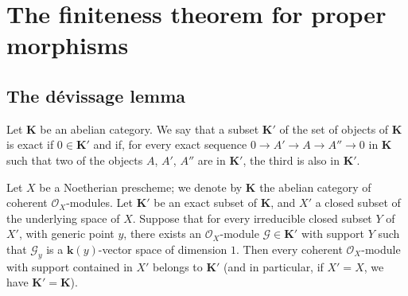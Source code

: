 \section{The finiteness theorem for proper morphisms}
\label{section:III.3}

\subsection{The dévissage lemma}
\label{subsection:III.3.1}

\begin{definition}[3.1.1]
\label{III.3.1.1}
Let $\boldsymbol{K}$ be an abelian category. We say that a subset $\boldsymbol{K}'$ of
the set of objects of $\boldsymbol{K}$ is exact if $0\in\boldsymbol{K}'$ and if, for every
exact sequence $0\to A'\to A\to A''\to0$
in $\boldsymbol{K}$ such that two of the objects $A$, $A'$, $A''$ are in $\boldsymbol{K}'$, the
third is also in $\boldsymbol{K}'$.
\end{definition}

\begin{theorem}[3.1.2]
\label{III.3.1.2}
Let $X$ be a Noetherian prescheme; we denote by $\boldsymbol{K}$ the abelian category
of coherent $\mathcal O_X$-modules. Let $\boldsymbol{K}'$ be an exact subset of
$\boldsymbol{K}$, and $X'$ a closed subset of the underlying space of $X$. Suppose that
for every irreducible closed subset $Y$ of $X'$, with generic point $y$, there
exists an $\mathcal O_X$-module $\mathcal G\in\boldsymbol{K}'$ with support $Y$ such that $\mathcal G_y$ is
a $\boldsymbol{k}(y)$-vector space of dimension $1$. Then every coherent $\mathcal O_X$-module
with support contained in $X'$ belongs to $\boldsymbol{K}'$ (and in particular,
if $X'=X$, we have $\boldsymbol{K}'=\boldsymbol{K}$).
\end{theorem}


